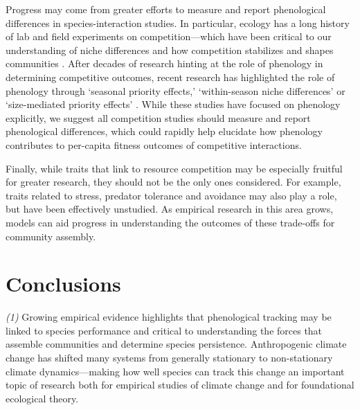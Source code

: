 \documentclass[11pt,letterpaper]{article}
\newcommand{\R}[1]{\label{}\linelabel{#1}}
\begin{document}
\R{r2exp}Progress may come from greater efforts to measure and report phenological differences in species-interaction studies. In particular, ecology has a long history of lab and field experiments on competition---which have been critical to our understanding of niche differences and how competition stabilizes and shapes communities \citep{Grime:1977sw,Chesson:2004eo}. After decades of research hinting at the role of phenology in determining competitive outcomes, recent research has highlighted the role of phenology through `seasonal priority effects,' `within-season niche differences' or `size-mediated priority effects' \citep{Rasmussen2014,smith2018,taylor2019,blackford2020}. While these studies have focused on phenology explicitly, we suggest all competition studies should measure and report phenological differences, which could rapidly help elucidate how phenology contributes to per-capita fitness outcomes of competitive interactions.\R{r2expend}

Finally, while traits that link to resource competition may be especially fruitful for greater research, they should not be the only ones considered. For example, traits related to stress, predator tolerance and avoidance may also play a role, but have been effectively unstudied.  As empirical research in this area grows, models can aid progress in understanding the outcomes of these trade-offs for community assembly.  


\section{Conclusions}
\emph{(1)} Growing empirical evidence highlights that phenological tracking may be linked to species performance and critical to understanding the forces that assemble communities and determine species persistence. Anthropogenic climate change has shifted many systems from generally stationary to non-stationary climate dynamics---making how well species can track this change an important topic of research both for empirical studies of climate change and for foundational ecological theory. 
\end{document}
